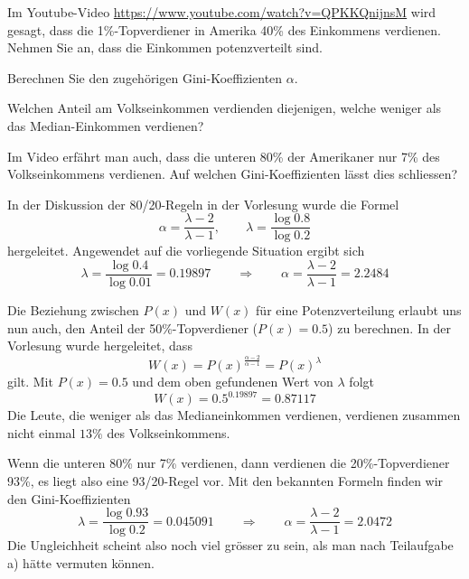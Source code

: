 Im Youtube-Video \url{https://www.youtube.com/watch?v=QPKKQnijnsM} wird
gesagt, dass die 1\%-Topverdiener in Amerika 40\% des Einkommens
verdienen. Nehmen Sie an, dass die Einkommen potenzverteilt sind.
\begin{teilaufgaben}
\item
Berechnen Sie den zugehörigen Gini-Koeffizienten $\alpha$.
\item
Welchen Anteil am Volkseinkommen verdienden diejenigen, welche
weniger als das Median-Einkommen verdienen?
\item
Im Video erfährt man auch, dass die unteren 80\% der Amerikaner nur
7\% des Volkseinkommens verdienen. 
Auf welchen Gini-Koeffizienten lässt dies schliessen?
\end{teilaufgaben}

\begin{loesung}
\begin{teilaufgaben}
\item
In der Diskussion der 80/20-Regeln in der Vorlesung wurde die Formel
\[
\alpha=\frac{\lambda-2}{\lambda-1},\qquad \lambda=\frac{\log 0.8}{\log 0.2}
\]
hergeleitet. Angewendet auf die vorliegende Situation ergibt sich
\[
\lambda=\frac{\log 0.4}{\log 0.01}=0.19897
\qquad
\Rightarrow
\qquad
\alpha=\frac{\lambda - 2}{\lambda - 1}=2.2484
\]
\item
Die Beziehung zwischen $P(x)$ und $W(x)$ für eine Potenzverteilung erlaubt
uns nun auch, den Anteil der 50\%-Topverdiener ($P(x)=0.5$) zu berechnen.
In der Vorlesung wurde hergeleitet, dass 
\[
W(x)=P(x)^\frac{\alpha - 2}{\alpha - 1}=P(x)^\lambda
\]
gilt. Mit $P(x)=0.5$ und dem oben gefundenen Wert von $\lambda$
folgt
\[
W(x)=0.5^{0.19897}=0.87117
\]
Die Leute, die weniger als das Medianeinkommen verdienen, verdienen zusammen
nicht einmal $13\%$ des Volkseinkommens.
\item
Wenn die unteren 80\% nur 7\% verdienen, dann verdienen die 20\%-Topverdiener
93\%, es liegt also eine 93/20-Regel vor. Mit den bekannten Formeln finden
wir den Gini-Koeffizienten
\[
\lambda=\frac{\log 0.93}{\log 0.2}=0.045091
\qquad\Rightarrow\qquad
\alpha=\frac{\lambda - 2}{\lambda - 1}=2.0472
\]
Die Ungleichheit scheint also noch viel grösser zu sein, als
man nach Teilaufgabe a) hätte vermuten können.
\qedhere
\end{teilaufgaben}
\end{loesung}

